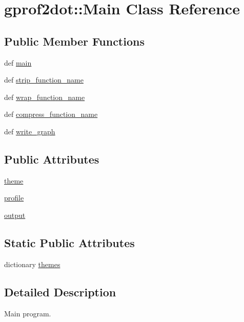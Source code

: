 \hypertarget{classgprof2dot_1_1Main}{
\section{gprof2dot::Main Class Reference}
\label{classgprof2dot_1_1Main}
}
\subsection*{Public Member Functions}
\begin{DoxyCompactItemize}
\item 
def \hyperlink{classgprof2dot_1_1Main_a05dc7d61a14f2db62b00cab9ad9b9e6e}{main}
\item 
def \hyperlink{classgprof2dot_1_1Main_a7396fe1fcfc1767084a02df2d3c533ef}{strip\_\-function\_\-name}
\item 
def \hyperlink{classgprof2dot_1_1Main_acf754fe129a91d7028429b3256ee8abb}{wrap\_\-function\_\-name}
\item 
def \hyperlink{classgprof2dot_1_1Main_ae20eb6af5166b4ed5eedf64c2cd2630c}{compress\_\-function\_\-name}
\item 
def \hyperlink{classgprof2dot_1_1Main_ac87c8450a28611a59bbc614dde275ce7}{write\_\-graph}
\end{DoxyCompactItemize}
\subsection*{Public Attributes}
\begin{DoxyCompactItemize}
\item 
\hyperlink{classgprof2dot_1_1Main_a0aacbfe50adca4c4235ed59931d2aaf7}{theme}
\item 
\hyperlink{classgprof2dot_1_1Main_acc30f2c40e758640966334ea1b0b7168}{profile}
\item 
\hyperlink{classgprof2dot_1_1Main_aca2a8bc399f751f4d4fc0f98a99dd34d}{output}
\end{DoxyCompactItemize}
\subsection*{Static Public Attributes}
\begin{DoxyCompactItemize}
\item 
dictionary \hyperlink{classgprof2dot_1_1Main_a55b70aa532d4b73a9cf6633ee33a6f1d}{themes}
\end{DoxyCompactItemize}


\subsection{Detailed Description}
\begin{DoxyVerb}Main program.\end{DoxyVerb}
 

